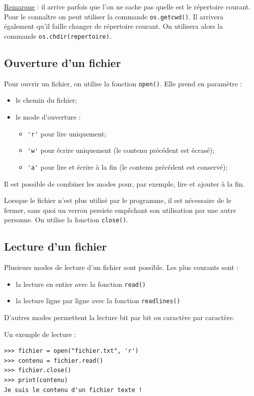 \documentclass[12pt, a4paper]{article}
\begin{document}
\underline{Remarque} : il arrive parfois que l'on ne sache pas quelle est le répertoire courant. Pour le connaître on peut utiliser la commande \lstinline{os.getcwd()}. Il arrivera également qu'il faille changer de répertoire courant. On utilisera alors la commande \lstinline{os.chdir(repertoire)}.


\subsection{Ouverture d'un fichier}
Pour ouvrir un fichier, on utilise la fonction \lstinline{open()}. Elle prend en paramètre :
\begin{itemize}
	\item le chemin du fichier;
	\item le mode d'ouverture :
	\begin{itemize}
		\item \lstinline{'r'} pour lire uniquement;
		\item \lstinline{'w'} pour écrire uniquement (le contenu précédent est écrasé);
		\item \lstinline{'a'} pour lire et écrire à la fin (le contenu précédent est conservé);
	\end{itemize}
\end{itemize}

Il est possible de combiner les modes pour, par exemple, lire et ajouter à la fin.

Lorsque le fichier n'est plus utilisé par le programme, il est nécessaire de le fermer, sans quoi un verrou persiste empêchant son utilisation par une autre personne. On utilise la fonction \lstinline{close()}.


\subsection{Lecture d'un fichier}
Plusieurs modes de lecture d'un fichier sont possible. Les plus courants sont :
\begin{itemize}
	\item la lecture en entier avec la fonction \lstinline{read()}
	\item la lecture ligne par ligne avec la fonction \lstinline{readlines()}
\end{itemize}

D'autres modes permettent la lecture bit par bit ou caractère par caractère.

Un exemple de lecture :
\begin{lstlisting}
>>> fichier = open("fichier.txt", 'r')
>>> contenu = fichier.read()
>>> fichier.close()
>>> print(contenu)
Je suis le contenu d'un fichier texte !
\end{lstlisting}
\end{document}
